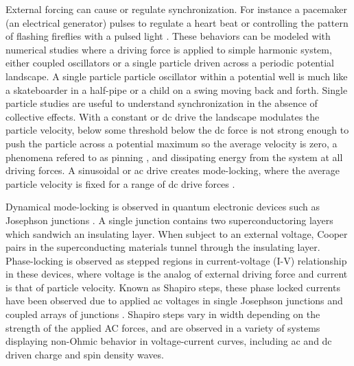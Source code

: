 \documentclass[twocolumn,preprintnumbers,amsmath,amssymb,aps,prx]{revtex4}
\begin{document}
External forcing can cause or regulate 
synchronization. %
For instance a
pacemaker (an electrical generator)
pulses to regulate a heart beat
or controlling the pattern of flashing
fireflies with a pulsed light \cite{Agrawal2013}.
These behaviors can be modeled with
numerical studies %
where
a driving force is applied to simple harmonic system,
either
coupled oscillators %
or a single particle driven across a periodic potential landscape.
A single particle particle oscillator
within a potential well is 
much like a skateboarder in a half-pipe or
a child on a swing
moving back and forth. %
Single particle studies 
are useful to understand synchronization
in the absence of collective effects.
With a constant or 
dc drive the landscape modulates 
the particle velocity, below some threshold below
the dc force is not strong enough to push the particle
across a potential maximum so the average velocity is zero,
a phenomena refered to as pinning \cite{Reichhardt2017},
and dissipating energy from the system at all driving forces.
A sinusoidal or ac drive creates mode-locking,
where the average particle velocity
is fixed for a range of dc drive forces \cite{Reichhardt2015}.

Dynamical mode-locking
is %
observed
in quantum electronic
devices such as Josephson junctions \cite{Josephson1962,Josephson1965}.
A single junction contains 
two superconductoring layers which sandwich an insulating layer.
When subject to an external voltage,
Cooper pairs in the superconducting materials
tunnel through the insulating layer.
Phase-locking is observed as 
stepped regions in current-voltage (I-V) relationship in these devices,
where voltage is the analog of external driving force
and current is that of particle velocity.
Known as Shapiro steps, %
these phase locked currents  
have been observed due to applied ac voltages in 
single Josephson junctions \cite{Shapiro1963, Golubov2004} and
coupled arrays of junctions \cite{Benz1990}.
Shapiro steps vary in width depending on the strength of the
applied AC forces,
and are observed in a variety of systems
displaying
non-Ohmic behavior in voltage-current curves,
including
ac and dc driven
charge and spin density waves.
\end{document}
